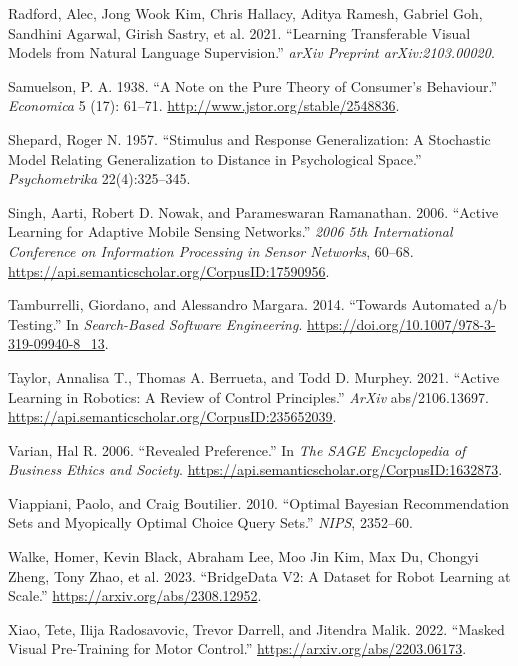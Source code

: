 \documentclass[
  letterpaper,
  numbers=noenddot,
  DIV=11,
  oneside]{scrreprt}
\newlength{\cslhangindent}
\newenvironment{CSLReferences}[2] %
 {\begin{list}{}{%
  \setlength{\itemindent}{0pt}
  \setlength{\leftmargin}{0pt}
  \setlength{\parsep}{0pt}
  \ifodd #1
   \setlength{\leftmargin}{\cslhangindent}
   \setlength{\itemindent}{-1\cslhangindent}
  \fi
  \setlength{\itemsep}{#2\baselineskip}}}
 {\end{list}}
\theoremstyle{remark}
\begin{document}
\begin{CSLReferences}{1}{0}
Radford, Alec, Jong Wook Kim, Chris Hallacy, Aditya Ramesh, Gabriel Goh,
Sandhini Agarwal, Girish Sastry, et al. 2021. {``Learning Transferable
Visual Models from Natural Language Supervision.''} \emph{arXiv Preprint
arXiv:2103.00020}.

Samuelson, P. A. 1938. {``A Note on the Pure Theory of Consumer's
Behaviour.''} \emph{Economica} 5 (17): 61--71.
\url{http://www.jstor.org/stable/2548836}.

Shepard, Roger N. 1957. {``Stimulus and Response Generalization: A
Stochastic Model Relating Generalization to Distance in Psychological
Space.''} \emph{Psychometrika} 22(4):325--345.

Singh, Aarti, Robert D. Nowak, and Parameswaran Ramanathan. 2006.
{``Active Learning for Adaptive Mobile Sensing Networks.''} \emph{2006
5th International Conference on Information Processing in Sensor
Networks}, 60--68.
\url{https://api.semanticscholar.org/CorpusID:17590956}.

Tamburrelli, Giordano, and Alessandro Margara. 2014. {``Towards
Automated a/b Testing.''} In \emph{Search-Based Software Engineering}.
\url{https://doi.org/10.1007/978-3-319-09940-8_13}.

Taylor, Annalisa T., Thomas A. Berrueta, and Todd D. Murphey. 2021.
{``Active Learning in Robotics: A Review of Control Principles.''}
\emph{ArXiv} abs/2106.13697.
\url{https://api.semanticscholar.org/CorpusID:235652039}.

Varian, Hal R. 2006. {``Revealed Preference.''} In \emph{The SAGE
Encyclopedia of Business Ethics and Society}.
\url{https://api.semanticscholar.org/CorpusID:1632873}.

Viappiani, Paolo, and Craig Boutilier. 2010. {``Optimal Bayesian
Recommendation Sets and Myopically Optimal Choice Query Sets.''}
\emph{NIPS}, 2352--60.

Walke, Homer, Kevin Black, Abraham Lee, Moo Jin Kim, Max Du, Chongyi
Zheng, Tony Zhao, et al. 2023. {``BridgeData V2: A Dataset for Robot
Learning at Scale.''} \url{https://arxiv.org/abs/2308.12952}.

Xiao, Tete, Ilija Radosavovic, Trevor Darrell, and Jitendra Malik. 2022.
{``Masked Visual Pre-Training for Motor Control.''}
\url{https://arxiv.org/abs/2203.06173}.


\end{CSLReferences}
\end{document}
